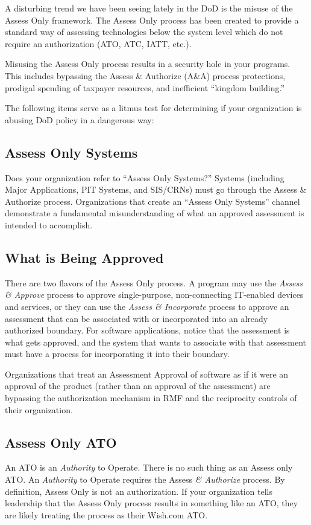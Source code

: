 A disturbing trend we have been seeing lately in the DoD is the misuse of the Assess Only framework. The Assess Only process has been created to provide a standard way of assessing technologies below the system level which do not require an authorization (ATO, ATC, IATT, etc.).\autocite[\pno~13]{20240212:dodi851001}

Misusing the Assess Only process results in a security hole in your programs. This includes bypassing the Assess \& Authorize (A\&A) process protections, prodigal spending of taxpayer resources, and inefficient ``kingdom building.''

The following items serve as a litmus test for determining if your organization is abusing DoD policy in a dangerous way:

\subsection{Assess Only Systems}
Does your organization refer to ``Assess Only Systems?'' Systems (including Major Applications, PIT Systems, and SIS/CRNs) must go through the Assess \& Authorize process. Organizations that create an ``Assess Only Systems'' channel demonstrate a fundamental misunderstanding of what an approved assessment is intended to accomplish.

\subsection{What is Being Approved}
There are two flavors of the Assess Only process. A program may use the \textit{Assess \& Approve} process to approve single-purpose, non-connecting IT-enabled devices and services, or they can use the \textit{Assess \& Incorporate} process to approve an assessment that can be associated with or incorporated into an already authorized boundary.\autocite[\pno~11]{20240212:vaglia2017} For software applications, notice that the assessment is what gets approved, and the system that wants to associate with that assessment must have a process for incorporating it into their boundary.

Organizations that treat an Assessment Approval of software as if it were an approval of the product (rather than an approval of the assessment) are bypassing the authorization mechanism in RMF and the reciprocity controls of their organization.

\subsection{Assess Only ATO}
An ATO is an \textit{Authority} to Operate. There is no such thing as an Assess only ATO. An \textit{Authority} to Operate requires the Assess \textit{\& Authorize} process. By definition, Assess Only is not an authorization. If your organization tells leadership that the Assess Only process results in something like an ATO, they are likely treating the process as their Wish.com ATO.

